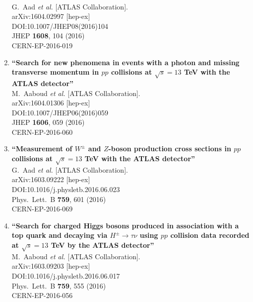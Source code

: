 \documentclass{article}
\begin{document}
\begin{enumerate}
  \\{}G.~Aad {\it et al.} [ATLAS Collaboration].
  \\{}arXiv:1604.02997 [hep-ex]
  \\{}DOI:10.1007/JHEP08(2016)104
  \\{}JHEP {\bf 1608}, 104 (2016)
  \\{}CERN-EP-2016-019
\item%
{\bf ``Search for new phenomena in events with a photon and missing transverse momentum in $pp$ collisions at $\sqrt{s}=13$ TeV with the ATLAS detector''}
  \\{}M.~Aaboud {\it et al.} [ATLAS Collaboration].
  \\{}arXiv:1604.01306 [hep-ex]
  \\{}DOI:10.1007/JHEP06(2016)059
  \\{}JHEP {\bf 1606}, 059 (2016)
  \\{}CERN-EP-2016-060
\item%
{\bf ``Measurement of $W^{\pm}$ and $Z$-boson production cross sections in $pp$ collisions at $\sqrt{s}=13$ TeV with the ATLAS detector''}
  \\{}G.~Aad {\it et al.} [ATLAS Collaboration].
  \\{}arXiv:1603.09222 [hep-ex]
  \\{}DOI:10.1016/j.physletb.2016.06.023
  \\{}Phys.\ Lett.\ B {\bf 759}, 601 (2016)
  \\{}CERN-EP-2016-069
\item%
{\bf ``Search for charged Higgs bosons produced in association with a top quark and decaying via $H^{\pm} \rightarrow \tau\nu$ using $pp$ collision data recorded at $\sqrt{s} = 13$ TeV by the ATLAS detector''}
  \\{}M.~Aaboud {\it et al.} [ATLAS Collaboration].
  \\{}arXiv:1603.09203 [hep-ex]
  \\{}DOI:10.1016/j.physletb.2016.06.017
  \\{}Phys.\ Lett.\ B {\bf 759}, 555 (2016)
  \\{}CERN-EP-2016-056

\end{enumerate}
\end{document}
